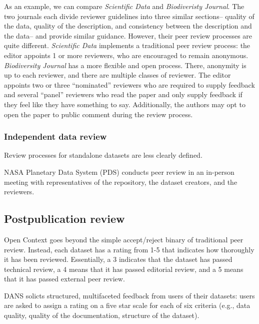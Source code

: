 \documentclass[10pt,twocolumn]{article}
\begin{document}
As an example, we can compare \emph{Scientific Data} and \emph{Biodiveristy Journal}.
The two journals each divide reviewer guidelines into three similar sections– quality of the data, quality of the description, and consistency between the description and the data– and provide similar guidance.
However, their peer review processes are quite different.
\emph{Scientific Data} implements a traditional peer review process: the editor appoints 1 or more reviewers, who are encouraged to remain anonymous.
\emph{Biodiversity Journal} has a more flexible and open process.
There, anonymity is up to each reviewer, and there are multiple classes of reviewer.
The editor appoints two or three ``nominated'' reviewers who are required to supply feedback and several ``panel'' reviewers who read the paper and only supply feedback if they feel like they have something to say.
Additionally, the authors may opt to open the paper to public comment during the review process.


\subsubsection*{Independent data review}
Review processes for standalone datasets are less clearly defined. 


NASA Planetary Data System (PDS) conducts peer review in an in-person meeting with representatives of the repository, the dataset creators, and the reviewers. 

\subsection*{Postpublication review}


Open Context goes beyond the simple accept/reject binary of traditional peer review.\cite{kansa_we_2013} 
Instead, each dataset has a rating from 1-5 that indicates how thoroughly it has been reviewed. 
Essentially, a 3 indicates that the dataset has passed technical review, a 4 means that it has passed editorial review, and a 5 means that it has passed external peer review. 

DANS solicts structured, multifaceted feedback from users of their datasets: users are asked to assign a rating on a five star scale for each of six criteria (e.g., data quality, quality of the documentation, structure of the dataset).\cite{grootveld_data_2011,grootveld_peer-reviewed_2012} 
\end{document}
